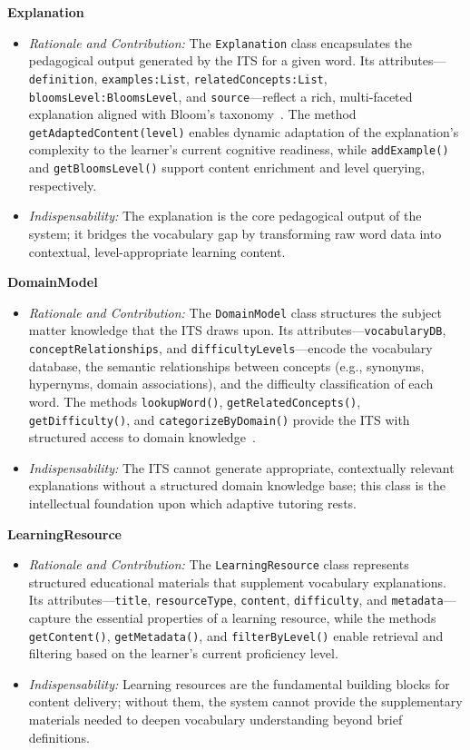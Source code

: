 \medskip
\textbf{Explanation}
\begin{itemize}
\item \textit{Rationale and Contribution:} The \texttt{Explanation} class encapsulates the pedagogical output generated by the ITS for a given word. Its attributes---\texttt{definition}, \texttt{examples:List}, \texttt{relatedConcepts:List}, \texttt{bloomsLevel:BloomsLevel}, and \texttt{source}---reflect a rich, multi-faceted explanation aligned with Bloom's taxonomy~\cite{Bloom1956,Krathwohl2002}. The method \texttt{getAdaptedContent(level)} enables dynamic adaptation of the explanation's complexity to the learner's current cognitive readiness, while \texttt{addExample()} and \texttt{getBloomsLevel()} support content enrichment and level querying, respectively.
\item \textit{Indispensability:} The explanation is the core pedagogical output of the system; it bridges the vocabulary gap by transforming raw word data into contextual, level-appropriate learning content.
\end{itemize}

\medskip
\textbf{DomainModel}
\begin{itemize}
\item \textit{Rationale and Contribution:} The \texttt{DomainModel} class structures the subject matter knowledge that the ITS draws upon. Its attributes---\texttt{vocabularyDB}, \texttt{conceptRelationships}, and \texttt{difficultyLevels}---encode the vocabulary database, the semantic relationships between concepts (e.g., synonyms, hypernyms, domain associations), and the difficulty classification of each word. The methods \texttt{lookupWord()}, \texttt{getRelatedConcepts()}, \texttt{getDifficulty()}, and \texttt{categorizeByDomain()} provide the ITS with structured access to domain knowledge~\cite{Anderson2001,VanLehn2011}.
\item \textit{Indispensability:} The ITS cannot generate appropriate, contextually relevant explanations without a structured domain knowledge base; this class is the intellectual foundation upon which adaptive tutoring rests.
\end{itemize}

\medskip
\textbf{LearningResource}
\begin{itemize}
\item \textit{Rationale and Contribution:} The \texttt{LearningResource} class represents structured educational materials that supplement vocabulary explanations. Its attributes---\texttt{title}, \texttt{resourceType}, \texttt{content}, \texttt{difficulty}, and \texttt{metadata}---capture the essential properties of a learning resource, while the methods \texttt{getContent()}, \texttt{getMetadata()}, and \texttt{filterByLevel()} enable retrieval and filtering based on the learner's current proficiency level.
\item \textit{Indispensability:} Learning resources are the fundamental building blocks for content delivery; without them, the system cannot provide the supplementary materials needed to deepen vocabulary understanding beyond brief definitions.
\end{itemize}

